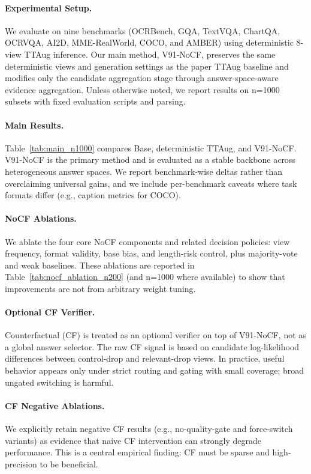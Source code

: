 
\paragraph{Experimental Setup.}
We evaluate on nine benchmarks (OCRBench, GQA, TextVQA, ChartQA, OCRVQA, AI2D, MME-RealWorld, COCO, and AMBER) using deterministic 8-view TTAug inference. Our main method, V91-NoCF, preserves the same deterministic views and generation settings as the paper TTAug baseline and modifies only the candidate aggregation stage through answer-space-aware evidence aggregation. Unless otherwise noted, we report results on n=1000 subsets with fixed evaluation scripts and parsing.

\paragraph{Main Results.}
Table~\ref{tab:main_n1000} compares Base, deterministic TTAug, and V91-NoCF. V91-NoCF is the primary method and is evaluated as a stable backbone across heterogeneous answer spaces. We report benchmark-wise deltas rather than overclaiming universal gains, and we include per-benchmark caveats where task formats differ (e.g., caption metrics for COCO).

\paragraph{NoCF Ablations.}
We ablate the four core NoCF components and related decision policies: view frequency, format validity, base bias, and length-risk control, plus majority-vote and weak baselines. These ablations are reported in Table~\ref{tab:nocf_ablation_n200} (and n=1000 where available) to show that improvements are not from arbitrary weight tuning.

\paragraph{Optional CF Verifier.}
Counterfactual (CF) is treated as an optional verifier on top of V91-NoCF, not as a global answer selector. The raw CF signal is based on candidate log-likelihood differences between control-drop and relevant-drop views. In practice, useful behavior appears only under strict routing and gating with small coverage; broad ungated switching is harmful.

\paragraph{CF Negative Ablations.}
We explicitly retain negative CF results (e.g., no-quality-gate and force-switch variants) as evidence that naive CF intervention can strongly degrade performance. This is a central empirical finding: CF must be sparse and high-precision to be beneficial.

